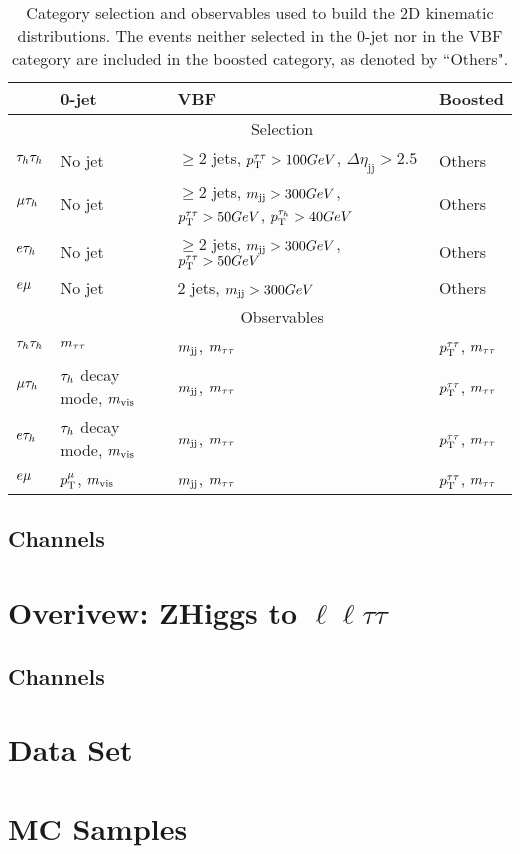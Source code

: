 \begin{table*}
\centering
\begin{tabular}{llll}
 & 0-jet & VBF & Boosted \\
\hline
 & \multicolumn{3}{c}{Selection} \\ \cline{2-4}
$\tau_{h}\tau_{h}$ & No jet &  $\geq$2 jets, $p_\mathrm{T}^{\tau\tau}>100GeV$, $\Delta\eta_{\mathrm{jj}}>2.5$ & Others\\
$\mu\tau_{h}$ & No jet &  $\geq$2 jets, $m_\mathrm{jj}>300GeV$, $p_\mathrm{T}^{\tau\tau}>50GeV$, $p_\mathrm{T}^{\tau_{h}}>40GeV$ & Others\\
$e\tau_{h}$ & No jet &  $\geq$2 jets, $m_\mathrm{jj}>300GeV$, $p_\mathrm{T}^{\tau\tau}>50GeV$ & Others\\
$e\mu$ & No jet & 2 jets, $m_\mathrm{jj}>300GeV$ & Others \\
\hline
 & \multicolumn{3}{c}{Observables}\\ \cline{2-4}
$\tau_{h}\tau_{h}$ & $m_{\tau\tau}$                 &    $m_\mathrm{jj}$, $m_{\tau\tau}$  &   $p_\mathrm{T}^{\tau\tau}$, $m_{\tau\tau}$  \\
$\mu\tau_{h}$ & $\tau_{h}$ decay mode, $m_\text{vis}$   &    $m_\mathrm{jj}$, $m_{\tau\tau}$  &  $p_\mathrm{T}^{\tau\tau}$, $m_{\tau\tau}$  \\
$e\tau_{h}$ & $\tau_{h}$ decay mode, $m_\text{vis}$   &    $m_\mathrm{jj}$, $m_{\tau\tau}$  &  $p_\mathrm{T}^{\tau\tau}$, $m_{\tau\tau}$ \\
$e\mu$ & $p_\mathrm{T}^{\mu}$, $m_\text{vis}$   &     $m_\mathrm{jj}$, $m_{\tau\tau}$  &   $p_\mathrm{T}^{\tau\tau}$, $m_{\tau\tau}$  \\
\hline
\end{tabular}
\caption{ Category selection and observables used to build the 2D kinematic distributions. The events neither selected in the 0-jet nor in the VBF category are included in the boosted category, as denoted by ``Others".
\label{tab:categories}
}
\end{table*}

\subsection{Channels}
\section{Overivew: ZHiggs to $\ell\ell\tau\tau$}
\subsection{Channels}
\section{Data Set}
\section{MC Samples}
